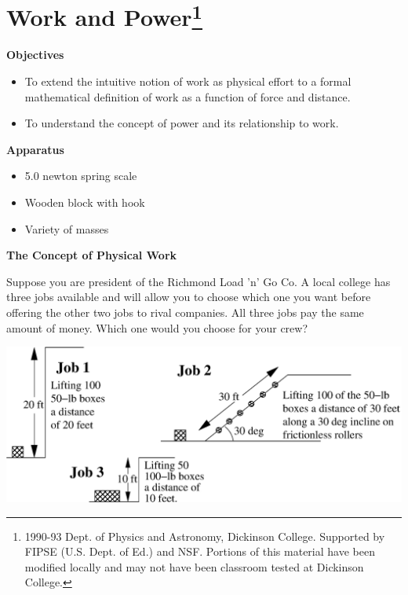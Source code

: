 \section{Work and Power\footnote{
1990-93 Dept. of Physics and Astronomy, Dickinson College. Supported by FIPSE
(U.S. Dept. of Ed.) and NSF. Portions of this material have been modified locally
and may not have been classroom tested at Dickinson College.
}}

\label{work_power}

\makelabheader %

\textbf{Objectives }

\begin{itemize}
\item To extend the intuitive notion of work as physical effort to a formal mathematical
definition of work as a function of force and distance. 
\item To understand the concept of power and its relationship to work.
\end{itemize}
\textbf{Apparatus }

\begin{itemize}
\item 5.0 newton spring scale 
\item Wooden block with hook 
\item Variety of masses
\end{itemize}
\textbf{The Concept of Physical Work }

Suppose you are president of the Richmond Load 'n' Go Co. A local college has
three jobs available and will allow you to choose which one you want before
offering the other two jobs to rival companies. All three jobs pay the same
amount of money. Which one would you choose for your crew?

\vspace{0.3cm}
{\par\centering \includegraphics[width=6.2in,]{work_power/work_power_fig1b.eps} \par}
\vspace{0.3cm}

